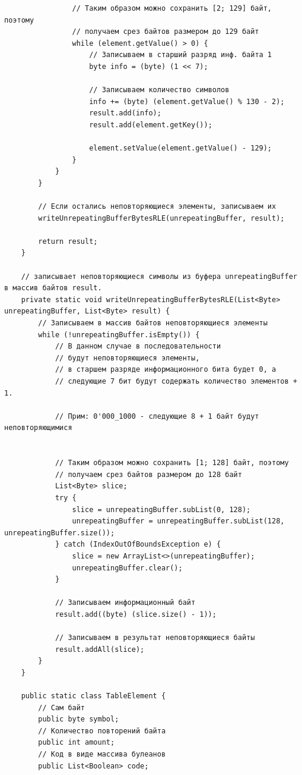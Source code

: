 \documentclass[a4paper,14pt]{extarticle}
\begin{document}
\begin{verbatim}
                // Таким образом можно сохранить [2; 129] байт, поэтому
                // получаем срез байтов размером до 129 байт
                while (element.getValue() > 0) {
                    // Записываем в старший разряд инф. байта 1
                    byte info = (byte) (1 << 7);

                    // Записываем количество символов
                    info += (byte) (element.getValue() % 130 - 2);
                    result.add(info);
                    result.add(element.getKey());

                    element.setValue(element.getValue() - 129);
                }
            }
        }

        // Если остались неповторяющиеся элементы, записываем их
        writeUnrepeatingBufferBytesRLE(unrepeatingBuffer, result);

        return result;
    }

    // записывает неповторяющиеся символы из буфера unrepeatingBuffer в массив байтов result.
    private static void writeUnrepeatingBufferBytesRLE(List<Byte> unrepeatingBuffer, List<Byte> result) {
        // Записываем в массив байтов неповторяющиеся элементы
        while (!unrepeatingBuffer.isEmpty()) {
            // В данном случае в последовательности
            // будут неповторяющиеся элементы,
            // в старшем разряде информационного бита будет 0, а
            // следующие 7 бит будут содержать количество элементов + 1.

            // Прим: 0'000_1000 - следующие 8 + 1 байт будут неповторяющимися


            // Таким образом можно сохранить [1; 128] байт, поэтому
            // получаем срез байтов размером до 128 байт
            List<Byte> slice;
            try {
                slice = unrepeatingBuffer.subList(0, 128);
                unrepeatingBuffer = unrepeatingBuffer.subList(128, unrepeatingBuffer.size());
            } catch (IndexOutOfBoundsException e) {
                slice = new ArrayList<>(unrepeatingBuffer);
                unrepeatingBuffer.clear();
            }

            // Записываем информационный байт
            result.add((byte) (slice.size() - 1));

            // Записываем в результат неповторяющиеся байты
            result.addAll(slice);
        }
    }

    public static class TableElement {
        // Сам байт
        public byte symbol;
        // Количество повторений байта
        public int amount;
        // Код в виде массива булеанов
        public List<Boolean> code;


\end{verbatim}
\end{document}
